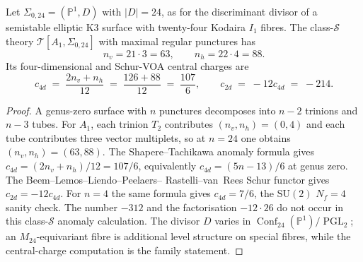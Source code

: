 \begin{proposition}
\label{rem:csd-1}
Let $\Sigma_{0,24}=(\mathbb P^1,D)$ with $|D|=24$, as for the
discriminant divisor of a semistable elliptic K3 surface with
twenty-four Kodaira $I_1$ fibres. The class-$\mathcal S$ theory
$\mathcal T[A_1,\Sigma_{0,24}]$ with maximal regular punctures has
\[
n_v = 21\cdot 3 = 63,\qquad
n_h = 22\cdot 4 = 88.
\]
Its four-dimensional and Schur-VOA central charges are
\[
c_{4d}
\;=\;
\frac{2n_v+n_h}{12}
\;=\;
\frac{126+88}{12}
\;=\;
\frac{107}{6},
\qquad
c_{2d}
\;=\;
-12c_{4d}
\;=\;
-214.
\]
\end{proposition}

\begin{proof}
A genus-zero surface with $n$ punctures decomposes into $n-2$
trinions and $n-3$ tubes. For $A_1$, each trinion $T_2$ contributes
$(n_v,n_h)=(0,4)$ and each tube contributes three vector multiplets,
so at $n=24$ one obtains $(n_v,n_h)=(63,88)$. The
Shapere--Tachikawa anomaly formula gives
$c_{4d}=(2n_v+n_h)/12=107/6$, equivalently
$c_{4d}=(5n-13)/6$ at genus zero. The Beem--Lemos--Liendo--Peelaers--
Rastelli--van~Rees Schur functor gives $c_{2d}=-12c_{4d}$.
For $n=4$ the same formula gives $c_{4d}=7/6$, the
$\mathrm{SU}(2)$ $N_f=4$ sanity check. The number $-312$ and the
factorisation $-12\cdot 26$ do not occur in this class-$\mathcal S$
anomaly calculation. The divisor $D$ varies in
\(\operatorname{Conf}_{24}(\mathbb P^1)/\operatorname{PGL}_2\); an
$M_{24}$-equivariant fibre is additional level structure on special
fibres, while the central-charge computation is the family statement.
\end{proof}

